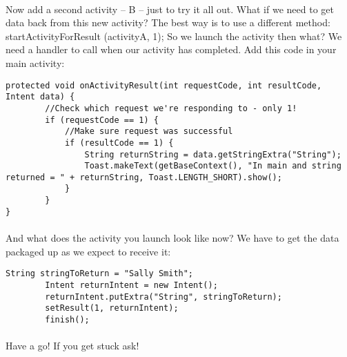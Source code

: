 \paragraph{} Now add a second activity – B – just to try it all out. What if we need to get data back from this new activity? The best way is to use a different method: startActivityForResult (activityA, 1);
So we launch the activity then what? We need a handler to call when our activity has completed. Add this code in your main activity:

\begin{lstlisting}
protected void onActivityResult(int requestCode, int resultCode, Intent data) {
    	//Check which request we're responding to - only 1!
    	if (requestCode == 1) {
    		//Make sure request was successful
    		if (resultCode == 1) {
    			String returnString = data.getStringExtra("String");
    			Toast.makeText(getBaseContext(), "In main and string returned = " + returnString, Toast.LENGTH_SHORT).show();
    		}
    	}
}
\end{lstlisting}

\paragraph{} And what does the activity you launch look like now? We have to get the data packaged up as we expect to receive it:

\begin{lstlisting}
String stringToReturn = "Sally Smith";
        Intent returnIntent = new Intent();
        returnIntent.putExtra("String", stringToReturn);
        setResult(1, returnIntent);
        finish();
\end{lstlisting}

\paragraph{} Have a go! If you get stuck ask!



